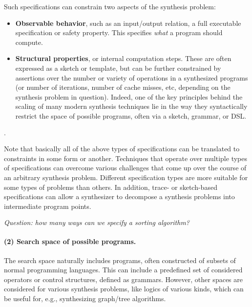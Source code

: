 \documentclass[11pt]{article}
\begin{document}
Such specifications can constrain two aspects of the synthesis problem:
\begin{itemize}
\item \textbf{Observable behavior}, such as an input/output relation, a full
  executable specification or safety property.  This specifies \emph{what} a
  program should compute.
\item \textbf{Structural properties}, or internal computation steps.  These are
  often expressed as a sketch or template, but can be further constrained by
  assertions over the number or variety of operations in a synthesized programs
  (or number of iterations, number of cache misses, etc, depending on the
  synthesis problem in question).  Indeed, one of the key principles behind the
  scaling of many modern synthesis techniques lie in the way they syntactically
  restrict the space of possible programs, often via a sketch, grammar, or DSL. 
\end{itemize}. 

Note that basically all of the above types of specifications can be translated
to constraints in some form or another.  
%
Techniques that operate over multiple types of specifications can overcome
various challenges that come up over the course of an arbitrary synthesis
problem.  Different specification types are more suitable for some types of
problems than others.  In addition, trace- or sketch-based specifications can
allow a synthesizer to decompose a synthesis problems into intermediate program
points.

\vspace{1em}
\noindent\emph{Question: how many ways can we specify a sorting algorithm?}

\paragraph{(2) Search space of possible programs.}  The search space naturally includes programs, often
constructed of subsets of normal programming languages.  This can include a
predefined set of considered operators or control structures, defined as
grammars.  However, other spaces are considered for various synthesis problems,
like logics of various kinds, which can be useful for, e.g., synthesizing
graph/tree algorithms. 
\end{document}
